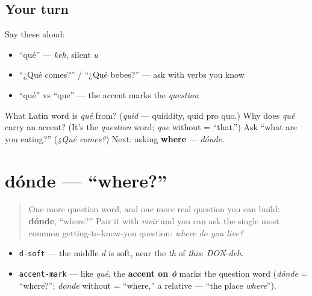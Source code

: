 \subsection*{Your turn}
Say these aloud:

\begin{itemize}
\raggedright
  \item \textquotedblleft{}qué\textquotedblright{} — \emph{keh}, silent \emph{u}
  \item \textquotedblleft{}¿Qué comes?\textquotedblright{} / \textquotedblleft{}¿Qué bebes?\textquotedblright{} — ask with verbs you know
  \item \textquotedblleft{}qué\textquotedblright{} vs \textquotedblleft{}que\textquotedblright{} — the accent marks the \emph{question}
\end{itemize}

\begin{tcolorbox}[breakable,colback=teal!4,colframe=teal!35!black,title={Before you move on}]
What Latin word is \emph{qué} from? (\emph{quid} — quiddity, quid pro quo.) Why does \emph{qué} carry an accent? (It's the \emph{question} word; \emph{que} without = \textquotedblleft{}that.\textquotedblright{}) Ask \textquotedblleft{}what are you eating?\textquotedblright{} (\emph{¿Qué comes?}) Next: asking \textbf{where} — \emph{dónde}.
\end{tcolorbox}
\section[dónde]{dónde — \textquotedblleft{}where?\textquotedblright{}}

\label{lesson:ES-C07-donde}



\begin{quote}
One more question word, and one more real question you can build: \textbf{dónde}, \textquotedblleft{}where?\textquotedblright{} Pair it with \emph{vivir} and you can ask the single most common getting-to-know-you question: \emph{where do you live?}
\end{quote}

\begin{sounds}
\begin{itemize}
\raggedright
  \item \texttt{d-soft} — the middle \emph{d} is soft, near the \emph{th} of \emph{this}: \emph{DON-deh}.
  \item \texttt{accent-mark} — like \emph{qué}, the \textbf{accent on \emph{ó}} marks the question word (\emph{dónde} = \textquotedblleft{}where?\textquotedblright{}; \emph{donde} without = \textquotedblleft{}where,\textquotedblright{} a relative — \textquotedblleft{}the place \emph{where}\textquotedblright{}).
\end{itemize}
\end{sounds}

